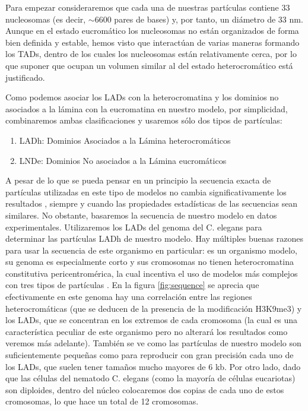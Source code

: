 Para empezar consideraremos que cada una de nuestras partículas contiene 33 nucleosomas (es decir, $\sim6600$ pares de bases) y, por tanto, un diámetro de 33 nm. Aunque en el estado eucromático los nucleosomas no están organizados de forma bien definida y estable, hemos visto que interactúan de varias maneras formando los TADs, dentro de los cuales los nucleosomas están relativamente cerca, por lo que suponer que ocupan un volumen similar al del estado heterocromático está justificado.

Como podemos asociar los LADs con la heterocromatina y los dominios no asociados a la lámina con la eucromatina \cite{Bajpai2021} en nuestro modelo, por simplicidad, combinaremos ambas clasificaciones y usaremos sólo dos tipos de partículas:
\begin{enumerate}
    \item LADh: Dominios Asociados a la Lámina heterocromáticos
    \item LNDe: Dominios No asociados a la Lámina eucromáticos
\end{enumerate}

A pesar de lo que se pueda pensar en un principio la secuencia exacta de partículas utilizadas en este tipo de modelos no cambia significativamente los resultados \cite{Bajpai2021}, siempre y cuando las propiedades estadísticas de las secuencias sean similares. No obstante, basaremos la secuencia de nuestro modelo en datos experimentales. Utilizaremos los LADs del genoma del C. elegans \cite{Ho2014,C.elegans1998} para determinar las partículas LADh de nuestro modelo. Hay múltiples buenas razones para usar la secuencia de este organismo en particular: es un organismo modelo, su genoma es especialmente corto y sus cromosomas no tienen heterocromatina constitutiva pericentromérica, la cual incentiva el uso de modelos más complejos con tres tipos de partículas \cite{Falk2019}. En la figura \ref{fig:sequence} se aprecia que efectivamente en este genoma hay una correlación entre las regiones heterocromáticas (que se deducen de la presencia de la modificación H3K9me3) y los LADs, que se concentran en los extremos de cada cromosoma (la cual es una característica peculiar de este organismo pero no alterará los resultados como veremos más adelante). También se ve como las partículas de nuestro modelo son suficientemente pequeñas como para reproducir con gran precisión cada uno de los LADs, que suelen tener tamaños mucho mayores de 6 kb. Por otro lado, dado que las células del nematodo C. elegans (como la mayoría de células eucariotas) son diploides, dentro del núcleo colocaremos dos copias de cada uno de estos cromosomas, lo que hace un total de 12 cromosomas.

